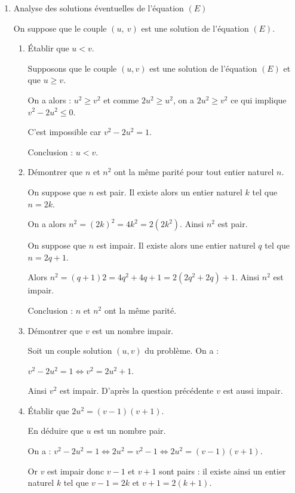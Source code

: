 \documentclass[12pt]{cornouaille}
\begin{document}
\begin{exercice}
\begin{enumerate}
\item Analyse des solutions éventuelles de l'équation $(E)$

On suppose que le couple $(u,~v)$ est une solution de l'équation $(E)$.
	\begin{enumerate}
		\item Établir que $u < v$.

\begin{solution}
Supposons que le couple $(u,v)$ est une solution de l'équation $(E)$ et que $u\geqslant v$. 
			
On a alors :  $u^2 \geqslant v^2$ et comme $2u^2 \geqslant u^2$, on a $2u^2 \geqslant v^2$ ce qui implique $v^2-2u^2\leqslant 0$. 

C'est impossible car $v^2-2u^2=1$.

Conclusion : $u < v$.	
\end{solution}
		\item  Démontrer que $n$ et $n^2$ ont la même parité pour tout entier naturel $n$.
		
\begin{solution}
On suppose que $n$ est pair. Il existe alors un entier naturel $k$
tel que $n=2k$.
			
On a alors $n^2=(2k)^2=4k^2=2(2k^2)$. Ainsi $n^2$ est pair.

On suppose que $n$ est impair. Il existe alors une entier naturel $q$ tel
que $n=2q+1$.

Alors $n^2=(q+1)2=4q^2+4q+1=2(2q^2+2q)+1$. Ainsi  $n^2$ est impair.


Conclusion : $n$ et $n^2$ ont la même parité.
\end{solution}

		\item  Démontrer que $v$ est un nombre impair.
		
\begin{solution}
Soit un couple solution $(u,v)$ du problème. On a  :
			
$v^2-2u^2=1 \iff v^2=2u^2+1$. 

Ainsi $v^2$ est impair. D'après la question précédente $v$ est aussi impair.
\end{solution}
		\item  Établir que $2u^2 =(v-1)(v+1)$.
		
En déduire que $u$ est un nombre pair.

\begin{solution}
On a : $v^2-2u^2=1 \iff 2u^2=v^2-1 \iff 2u^2=(v-1)(v+1)$.
			
Or $v$ est impair donc $v-1$ et  $v+1$ sont pairs : il existe ainsi un
entier naturel $k$ tel que $v-1=2k$ et $v+1=2(k+1)$.


\end{solution}
\end{enumerate}
\end{enumerate}
\end{exercice}
\end{document}
